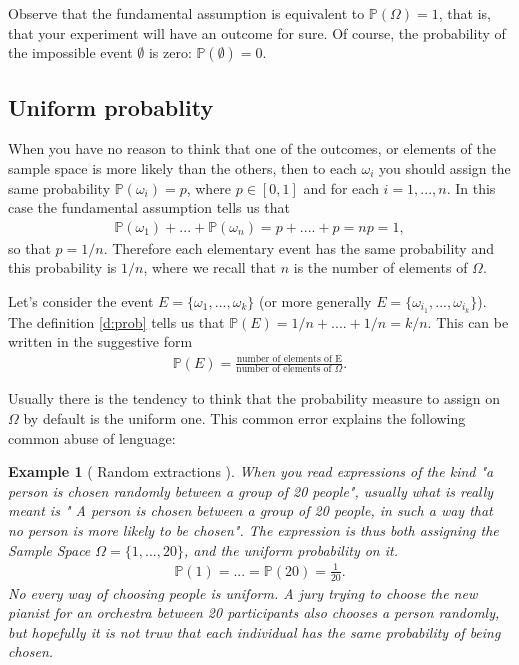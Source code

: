 \documentclass[12pt]{article}
\newtheorem{example}[theorem]{Example}
\newcommand{\<}{{\langle \!\! \langle}}
\renewcommand{\>}{{\rangle \!\! \rangle}}
\newcommand{\bel}[2]{\begin{equation} \label{#1} \begin{split} #2
 					\end{split} \end{equation}}
\begin{document}
	Observe that the fundamental assumption is equivalent to $\mathbb{P}(\Omega)=1$, that is, that your experiment will have an outcome for sure. Of course, the probability of the impossible event $\emptyset$ is zero: $ \mathbb{P}(\emptyset)=0$. 

	\subsection{Uniform probablity }
	When you have no reason to think that one of the outcomes, or elements of the sample space is more likely than the others, then to each $\omega_i$ you should assign the same probability $\mathbb{P}(\omega_i)=p$, where $p\in [0,1]$ and for each $i=1,...,n$. 
	In this case the fundamental assumption tells us that 
	\bel{}{\mathbb{P}(\omega_1)+...+\mathbb{P}(\omega_n)=p+....+p= np =1,}
	so that $p=1/n$. Therefore each elementary event has the same probability and this probability is $1/n$, where we recall that $n$ is the number of elements of $\Omega$. 



	Let's consider the event $E=\{\omega_1,...,\omega_k\}$ (or more generally $E=\{\omega_{i_1},...,\omega_{i_k}\}$). The definition  \eqref{d:prob} tells us that $\mathbb{P}(E)=1/n+....+1/n=k/n$. This can be written in the suggestive form 
	\bel{}{
		\mathbb{P}(E)=\frac{\textrm{number of elements of E}}{\textrm{number of elements of $\Omega$}}.}

	Usually there is the tendency to think that the probability measure to assign on $\Omega$ by default is the uniform one. This common error explains the following common abuse of lenguage:  
	

	\begin{example}[ Random extractions ]
		When you read expressions of the kind "a person is chosen randomly between a group of 20 people", usually what is really meant is " A person is chosen between a group of 20 people, in such a way that no person is more likely to be chosen". The expression is thus both assigning the Sample Space $\Omega=\{1,...,20\}$, and the uniform probability on it. 
\bel{e:ru}{\mathbb{P}(1)=...=\mathbb{P}(20)=\frac{1}{20}.}
 No every way of choosing people is uniform. A jury trying to choose the new pianist for an orchestra between 20 participants also chooses a person randomly, but hopefully it is not truw that each individual has the same probability of being chosen. 

\end{example}
\end{document}
